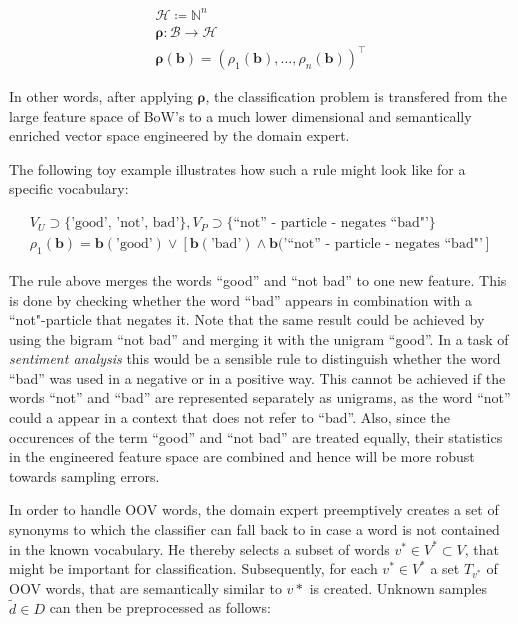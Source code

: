 \begin{eqnarray*}
\mathcal{H} \coloneqq \mathbb{N}^n \\
\boldsymbol\rho: \mathcal{B} \to \mathcal{H} \\
\boldsymbol{\rho}(\mathbf{b}) = (\rho_1(\mathbf{b}), \ldots,
\rho_n(\mathbf{b}))^\intercal 
\end{eqnarray*}

In other words, after applying $\boldsymbol\rho$, the classification problem is
transfered from the large feature space of BoW's to a much lower dimensional and
semantically enriched vector space engineered by the domain expert.

The following toy example illustrates how such a rule might look
like for a specific vocabulary: 

\begin{eqnarray*}
V_U \supset \{\text{'good', 'not', bad'}\}, V_P \supset \{\text{``not'' - particle -
negates\ ``bad"'}\} \\
\rho_1(\mathbf{b}) = \mathbf{b}(\text{'good'}) \lor \left[\mathbf{b}(\text{'bad'})
\land \mathbf{b}(\text{'``not'' - particle - negates\ ``bad"'}\right]
\end{eqnarray*}

The rule above merges the words ``good'' and ``not bad'' to one new feature.
This is done by checking whether the word ``bad'' appears in combination with a
``not"-particle that negates it. Note that the same result could be achieved
by using the bigram ``not bad'' and merging it with the unigram ``good''.
In a task of \emph{sentiment analysis} this would be a sensible rule to
distinguish whether the word ``bad'' was used in a negative or in a positive
way. This cannot be achieved if the words ``not''
and ``bad'' are represented separately as unigrams, as the word ``not'' could a
appear in a context that does not refer to ``bad''.
Also, since the occurences of the term ``good'' and ``not bad'' are treated
equally, their statistics in the engineered feature space are combined and
hence will be more robust towards sampling errors.

In order to handle OOV words, the domain expert preemptively creates a set of
synonyms to which the classifier can fall back to in case a word is not contained 
in the known vocabulary. He thereby selects a subset of words $v^* \in V^*
\subset V$, that might be important for classification. Subsequently,
for each $v^* \in V^*$ a set $T_{v^*}$ of OOV words, that are semantically
similar to $v*$ is created.  Unknown samples $\tilde{d} \in D$ can then be
preprocessed as follows:

